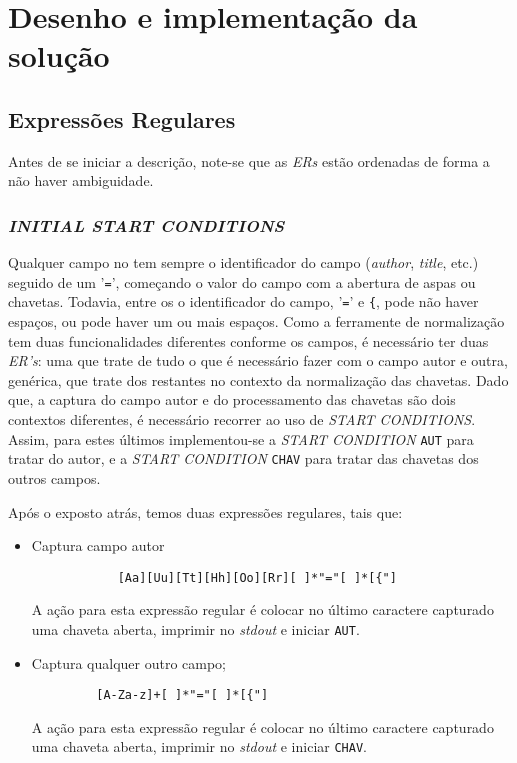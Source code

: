 \section{Desenho e implementação da solução}
\label{sec:des:b1}


\subsection{Expressões Regulares}

Antes de se iniciar a descrição, note-se que as \emph{ERs} estão ordenadas de
forma a não haver ambiguidade. 

\subsubsection{\emph{INITIAL \emph{START CONDITIONS}}}


Qualquer campo no  tem sempre o identificador do campo
(\emph{author}, \emph{title}, etc.) seguido de um '\texttt{=}', começando
o valor do campo com a abertura de aspas ou chavetas. Todavia, entre os
o identificador do campo, '\texttt{=}' e \texttt{\{}, pode não haver espaços, ou
pode haver um ou mais espaços. Como a ferramente de normalização tem duas
funcionalidades diferentes conforme os campos, é necessário ter duas
\emph{ER's}: uma que trate de tudo o que é necessário fazer com o campo autor
e outra, genérica, que trate dos restantes no contexto da normalização das
chavetas. Dado que, a captura do campo autor e do processamento das chavetas são
dois contextos diferentes, é necessário recorrer ao uso de \emph{START
CONDITIONS}. Assim, para estes últimos implementou-se a \emph{START 
CONDITION} \texttt{AUT} para tratar do autor, e a \emph{START
CONDITION} \texttt{CHAV} para tratar das chavetas dos outros campos.


Após o exposto atrás, temos duas expressões regulares, tais que:

\begin{itemize}
	\item Captura campo autor
\begin{verbatim}
			[Aa][Uu][Tt][Hh][Oo][Rr][ ]*"="[ ]*[{"]
\end{verbatim}
A ação para esta expressão regular é colocar no último caractere capturado uma
chaveta aberta, imprimir no \emph{stdout} e iniciar \texttt{AUT}.
		

	\item Captura qualquer outro campo;
\begin{verbatim}
		 [A-Za-z]+[ ]*"="[ ]*[{"]
\end{verbatim}
A ação para esta expressão regular é colocar no último caractere capturado uma
chaveta aberta, imprimir no \emph{stdout} e iniciar \texttt{CHAV}.
\end{itemize}


